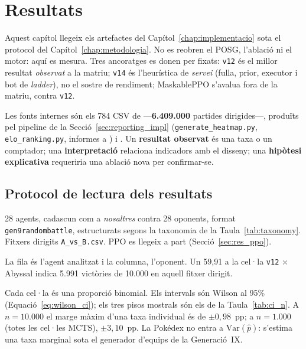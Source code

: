 \chapter{Resultats}
\label{chap:resultats}

Aquest capítol llegeix els artefactes del Capítol~\ref{chap:implementacio} sota el protocol del Capítol~\ref{chap:metodologia}. No es reobren el POSG, l'ablació ni el motor: aquí es mesura. Tres ancoratges es donen per fixats: \texttt{v12} és el millor resultat \emph{observat} a la matriu; \texttt{v14} és l'heurística de \emph{servei} (fulla, prior, executor i bot de \emph{ladder}), no el sostre de rendiment; MaskablePPO s'avalua fora de la matriu, contra \texttt{v12}.

Les fonts internes són els 784 CSV de  ---\textbf{6.409.000} partides dirigides---, produïts pel pipeline de la Secció~\ref{sec:reporting_impl} (\texttt{generate\_heatmap.py}, \texttt{elo\_ranking.py}, informes a ) i . Un \textbf{resultat observat} és una taxa o un comptador; una \textbf{interpretació} relaciona indicadors amb el disseny; una \textbf{hipòtesi explicativa} requeriria una ablació nova per confirmar-se.

\section{Protocol de lectura dels resultats}
\label{sec:res_protocol}

28 agents, cadascun com a \emph{nosaltres} contra 28 oponents, format \texttt{gen9randombattle}, estructurats segons la taxonomia de la Taula~\ref{tab:taxonomy}. Fitxers dirigits \texttt{A\_vs\_B.csv}. PPO es llegeix a part (Secció~\ref{sec:res_ppo}).



La fila és l'agent analitzat i la columna, l'oponent. Un 59,91 a la cel·la \texttt{v12} $\times$ Abyssal indica 5.991 victòries de 10.000 en aquell fitxer dirigit.

Cada cel·la és una proporció binomial. Els intervals són Wilson al 95\% (Equació~\ref{eq:wilson_ci}); els tres pisos mostrals són els de la Taula~\ref{tab:ci_n}. A $n=10.000$ el marge màxim d'una taxa individual és de $\pm 0{,}98$~pp; a $n=1.000$ (totes les cel·les MCTS), $\pm 3{,}10$~pp. La Pokédex no entra a $\mathrm{Var}(\hat p)$: s'estima una taxa marginal sota el generador d'equips de la Generació~IX.

